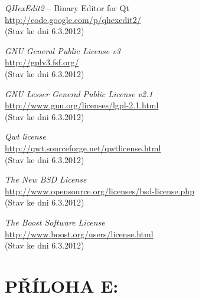 \documentclass[12pt, a4paper, oneside]{article}
\newcommand{\It}{\textit}  %
\begin{document}
\begin{thebibliography}{99}
     \It{QHexEdit2} -- Binary Editor for Qt \\
    \url{http://code.google.com/p/qhexedit2/}\\
    (Stav ke dni 6.3.2012)

     \It{GNU General Public License v3} \\
    \url{http://gplv3.fsf.org/}\\
    (Stav ke dni 6.3.2012)

     \It{GNU Lesser General Public License v2.1} \\
    \url{http://www.gnu.org/licenses/lgpl-2.1.html}\\
    (Stav ke dni 6.3.2012)

     \It{Qwt license} \\
    \url{http://qwt.sourceforge.net/qwtlicense.html}\\
    (Stav ke dni 6.3.2012)

     \It{The New BSD License} \\
    \url{http://www.opensource.org/licenses/bsd-license.php}\\
    (Stav ke dni 6.3.2012)

     \It{The Boost Software License} \\
    \url{http://www.boost.org/users/license.html}\\
    (Stav ke dni 6.3.2012)

\end{thebibliography}

\newpage
\section*{PŘÍLOHA E:}
\listoffigures   %
\end{document}
